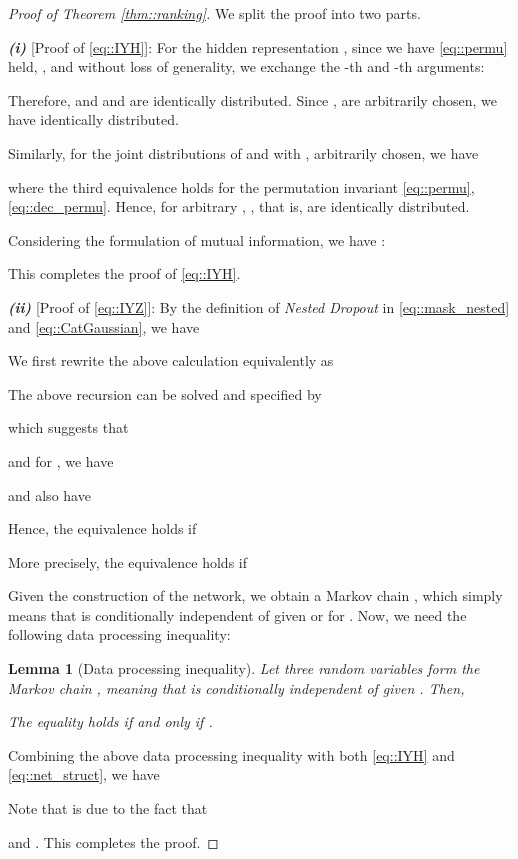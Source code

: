 \documentclass[journal]{IEEEtran}
\newtheorem{lemma}{Lemma}
\begin{document}
\begin{proof} [Proof of Theorem \ref{thm::ranking}]
We split the proof into two parts.

    \textbf{\textit{(i)}} [Proof of \eqref{eq::IYH}]:
    For the hidden representation , since we have \eqref{eq::permu} held, , and  without loss of generality, we exchange the -th and -th arguments:
    
    Therefore,  and  and  are identically distributed.
    Since ,  are arbitrarily chosen, we have  identically distributed.
    
    Similarly, for the joint distributions of  and  with ,  arbitrarily chosen, we have
    \vspace{-1mm}
    
    where the third equivalence holds for the permutation invariant \eqref{eq::permu},\eqref{eq::dec_permu}.
    Hence,  for arbitrary , , that is,  are identically distributed.

    Considering the formulation of mutual information, we have :
    
    This completes the proof of \eqref{eq::IYH}.



\textbf{\textit{(ii)}} [Proof of \eqref{eq::IYZ}]:
By the definition of \textit{Nested Dropout} in \eqref{eq::mask_nested} and \eqref{eq::CatGaussian}, we have
\vspace{-1mm}

\vspace{-1mm}
We first rewrite the above calculation equivalently as 

The above recursion can be solved and specified by 
\vspace{-1mm}

which suggests that

and for , we have

and also have

Hence, the equivalence holds if

More precisely, the equivalence holds if

Given the construction of the network, we obtain a Markov chain , which simply means that  is conditionally independent of  given  or  for .
Now, we need the following data processing inequality:
\begin{lemma}[Data processing inequality]
Let three random variables form the Markov chain , meaning that  is conditionally independent of  given . Then,

The equality holds if and only if .
\end{lemma}

Combining the above data processing inequality with both \eqref{eq::IYH} and \eqref{eq::net_struct}, we have

Note that  is due to the fact that

and .
This completes the proof.
\end{proof}
\end{document}
